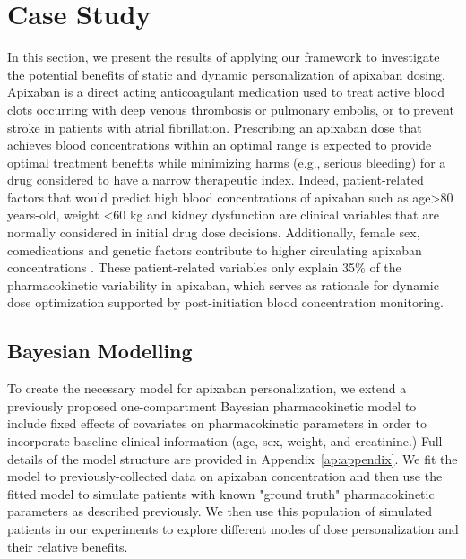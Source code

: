 \section{Case Study}\label{ss:casestudy}

In this section, we present the results of applying our framework to investigate the potential benefits of static and dynamic personalization of apixaban dosing. Apixaban is a direct acting anticoagulant medication used to treat active blood clots occurring with deep venous thrombosis or pulmonary embolis, or to prevent stroke in patients with atrial fibrillation. Prescribing an apixaban dose that achieves blood concentrations within an optimal range is expected to provide optimal treatment benefits while minimizing harms (e.g., serious bleeding) for a drug considered to have a narrow therapeutic index. Indeed, patient-related factors that would predict high blood concentrations of apixaban such as age>80 years-old, weight <60 kg and kidney dysfunction are clinical variables that are normally considered in initial drug dose decisions. Additionally, female sex, comedications and genetic factors contribute to higher circulating apixaban concentrations \cite{gulilat2020drug}. These patient-related variables only explain 35\% of the pharmacokinetic variability in apixaban, which serves as rationale for dynamic dose optimization supported by post-initiation blood concentration monitoring. 
\subsection{Bayesian Modelling}

To create the necessary model for apixaban personalization, we extend a previously proposed one-compartment Bayesian pharmacokinetic model \cite{pananos2020comparisons} to include fixed effects of covariates on pharmacokinetic parameters in order to incorporate baseline clinical information (age, sex, weight, and creatinine.)  Full details of the model structure are provided in Appendix~\ref{ap:appendix}. We fit the model to previously-collected data on apixaban concentration \cite{tirona2018apixaban} and then use the fitted model to simulate patients with known "ground truth" pharmacokinetic parameters as described previously. We then use this population of simulated patients in our experiments to explore different modes of dose personalization and their relative benefits.

